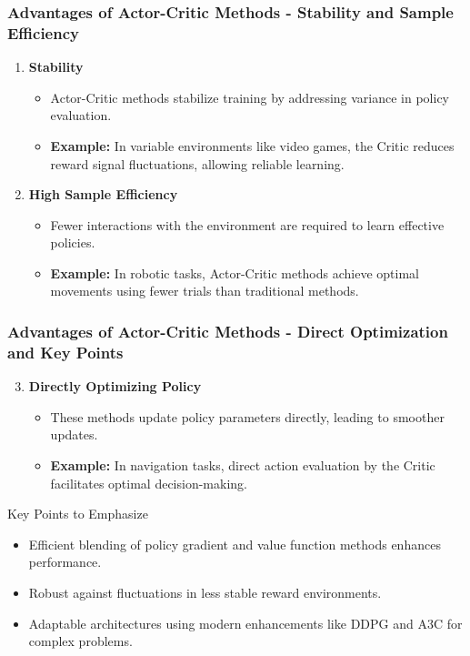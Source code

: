 \documentclass[aspectratio=169]{beamer}
\begin{document}
\begin{frame}[fragile]
    \frametitle{Advantages of Actor-Critic Methods - Stability and Sample Efficiency}
    \begin{enumerate}
        \item \textbf{Stability}
            \begin{itemize}
                \item Actor-Critic methods stabilize training by addressing variance in policy evaluation.
                \item \textbf{Example:} In variable environments like video games, the Critic reduces reward signal fluctuations, allowing reliable learning.
            \end{itemize}
        \item \textbf{High Sample Efficiency}
            \begin{itemize}
                \item Fewer interactions with the environment are required to learn effective policies.
                \item \textbf{Example:} In robotic tasks, Actor-Critic methods achieve optimal movements using fewer trials than traditional methods.
            \end{itemize}
    \end{enumerate}
\end{frame}

\begin{frame}[fragile]
    \frametitle{Advantages of Actor-Critic Methods - Direct Optimization and Key Points}
    \begin{enumerate}
        \setcounter{enumi}{2}
        \item \textbf{Directly Optimizing Policy}
            \begin{itemize}
                \item These methods update policy parameters directly, leading to smoother updates.
                \item \textbf{Example:} In navigation tasks, direct action evaluation by the Critic facilitates optimal decision-making.
            \end{itemize}
    \end{enumerate}
    
    \begin{block}{Key Points to Emphasize}
        \begin{itemize}
            \item Efficient blending of policy gradient and value function methods enhances performance.
            \item Robust against fluctuations in less stable reward environments.
            \item Adaptable architectures using modern enhancements like DDPG and A3C for complex problems.
        \end{itemize}
    \end{block}
\end{frame}
\end{document}
